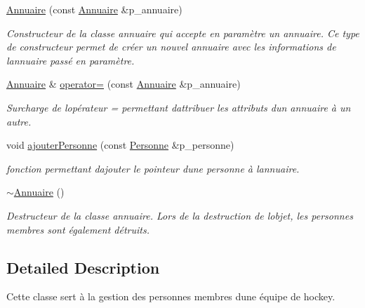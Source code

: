 \begin{DoxyCompactItemize}
\hyperlink{classhockey_1_1Annuaire_a9ced0f8c3c376e8e114ef04fd6b21e75}{Annuaire} (const \hyperlink{classhockey_1_1Annuaire}{Annuaire} \&p\+\_\+annuaire)
\begin{DoxyCompactList}\small\item\em Constructeur de la classe annuaire qui accepte en paramètre un annuaire. Ce type de constructeur permet de créer un nouvel annuaire avec les informations de l\textquotesingle{}annuaire passé en paramètre. \end{DoxyCompactList}\item 
\hyperlink{classhockey_1_1Annuaire}{Annuaire} \& \hyperlink{classhockey_1_1Annuaire_a1c30829ff248b46717d93583d94bdfa1}{operator=} (const \hyperlink{classhockey_1_1Annuaire}{Annuaire} \&p\+\_\+annuaire)
\begin{DoxyCompactList}\small\item\em Surcharge de l\textquotesingle{}opérateur = permettant d\textquotesingle{}attribuer les attributs d\textquotesingle{}un annuaire à un autre. \end{DoxyCompactList}\item 
void \hyperlink{classhockey_1_1Annuaire_a14257b2cc11fc7bc5fc2c930c4c23785}{ajouter\+Personne} (const \hyperlink{classhockey_1_1Personne}{Personne} \&p\+\_\+personne)
\begin{DoxyCompactList}\small\item\em fonction permettant d\textquotesingle{}ajouter le pointeur d\textquotesingle{}une personne à l\textquotesingle{}annuaire. \end{DoxyCompactList}\item 
\mbox{\label{classhockey_1_1Annuaire_a2f105cc572701bab0170b3aa3602a004}} 
\hyperlink{classhockey_1_1Annuaire_a2f105cc572701bab0170b3aa3602a004}{$\sim$\+Annuaire} ()
\begin{DoxyCompactList}\small\item\em Destructeur de la classe annuaire. Lors de la destruction de l\textquotesingle{}objet, les personnes membres sont également détruits. \end{DoxyCompactList}\end{DoxyCompactItemize}


\subsection{Detailed Description}
Cette classe sert à la gestion des personnes membres d\textquotesingle{}une équipe de hockey. 

